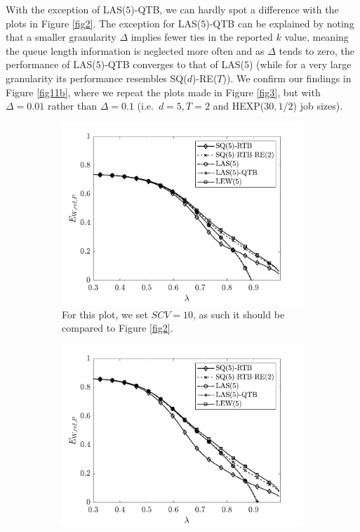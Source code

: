 \documentclass[12pt]{report}
\begin{document}
With the exception of LAS($5$)-QTB, we can hardly spot a difference with the plots in Figure \ref{fig2}. The exception for LAS($5$)-QTB can be explained by noting that
a smaller granularity $\Delta$ implies fewer ties in the reported $k$ value, meaning the queue length information
is neglected more often and as $\Delta$ tends to zero, the performance of LAS($5$)-QTB converges to that of LAS($5$) (while for a very large granularity its performance resembles SQ($d$)-RE($T$)). We confirm our findings in Figure \ref{fig11b}, where we repeat the plots made in Figure \ref{fig3}, but with $\Delta=0.01$ rather than $\Delta=0.1$ (i.e.~$d=5, T=2$ and HEXP($30, 1/2$) job sizes).
\begin{figure}[t]
\begin{center}
\begin{subfigure}{0.43\textwidth}
\centering
\captionsetup{width=.8\linewidth}
\includegraphics[width=1\linewidth]{figures/Chapter7/fig11a.pdf}
\caption{For this plot, we set $SCV=10$, as such it should be compared to Figure \ref{fig2}.}
\label{fig11a}
\end{subfigure}
\begin{subfigure}{.43\textwidth}
\centering
\captionsetup{width=.8\linewidth}
\includegraphics[width=1\linewidth]{figures/Chapter7/fig11b.pdf}

\end{subfigure}
\end{center}
\end{figure}
\end{document}
